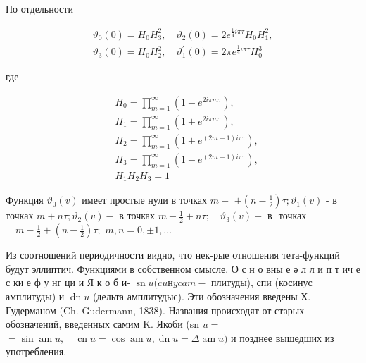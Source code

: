 \documentclass[10pt]{article}
\begin{document}
По отдельности



\[

\begin{gathered}

\vartheta_{0}(0)=H_{0} H_{3}^{2}, \quad \vartheta_{2}(0)=2 e^{\frac{1}{4} i \pi \tau} H_{0} H_{1}^{2}, \\

\vartheta_{3}(0)=H_{0} H_{2}^{2}, \quad \vartheta_{1}^{\prime}(0)=2 \pi e^{\frac{1}{4} i \pi \tau} H_{0}^{3}

\end{gathered}

\]



где



\[

\begin{aligned}

& H_{0}=\prod_{m=1}^{\infty}\left(1-e^{2 i \pi m \tau}\right), \\

& H_{1}=\prod_{m=1}^{\infty}\left(1+e^{2 i \pi m \tau}\right), \\

& H_{2}=\prod_{m=1}^{\infty}\left(1+e^{(2 m-1) i \pi \tau}\right), \\

& H_{3}=\prod_{m=1}^{\infty}\left(1-e^{(2 m-1) i \pi \tau}\right), \\

& H_{1} H_{2} H_{3}=1

\end{aligned}

\]



Функция $\vartheta_{0}(v)$ имеет простые нули в точках $m+$ $+\left(n-\frac{1}{2}\right) \tau ; \vartheta_{1}(v)$ - в точках $m+n \tau ; \vartheta_{2}(v)-$ в точках $m-\frac{1}{2}+n \tau ; \quad \vartheta_{3}(v)-\mathbf{\text { в }}$ точках $\quad m-\frac{1}{2}+\left(n-\frac{1}{2}\right) \tau ;$ $m, n=0, \pm 1, \ldots$



Из соотношений периодичности видно, что нек-рые отношения тета-функций будут эллиптич. Функциями в собственном смысле. О с н о вны е ә л л и п т ич е с ки е ф у нг ци и Я к о б и- $\operatorname{sn} u(c u н y c a m-$ плитуды), спи (косинус амплитуды) и $\operatorname{dn} u$ (дельта амплитудыс). Эти обозначения введены Х. Гудерманом (Ch. Gudermann, 1838). Названия происходят от старых обозначений, введенных самим $\mathrm{K}$. Якоби (sn $u=$ $=\sin \operatorname{am} u, \quad \operatorname{cn} u=\cos \operatorname{am} u, \operatorname{dn} u=\Delta \operatorname{am} u)$ и позднее вышедших из употребления.
\end{document}
